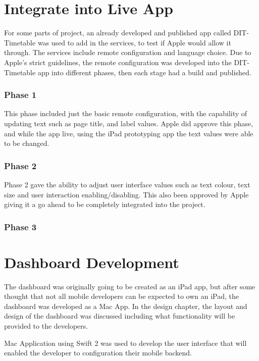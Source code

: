 \section{Integrate into Live App}

For some parts of project, an already developed and published app called DIT-Timetable was used to add in the services, to test if Apple would allow it through. The services include remote configuration and language choice. Due to Apple's strict guidelines, the remote configuration was developed into the DIT-Timetable app into different phases, then each stage had a build and published.

\subsubsection{Phase 1}
This phase included just the basic remote configuration, with the capability of updating text such as page title, and label values. Apple did approve this phase, and while the app live, using the iPad prototyping app the text values were able to be changed. 

\subsubsection{Phase 2}

Phase 2 gave the ability to adjust user interface values such as text colour, text size and user interaction enabling/disabling. This also been approved by Apple giving it a go ahead to be completely integrated into the project.

\subsubsection{Phase 3}

\section{Dashboard Development}

The dashboard was originally going to be created as an iPad app, but after some thought that not all mobile developers can be expected to own an iPad, the dashboard was developed as a Mac App. In the design chapter, the layout and design of the dashboard was discussed including what functionality will be provided to the developers.

Mac Application using Swift 2 was used to develop the user interface that will enabled the developer to configuration their mobile backend.

